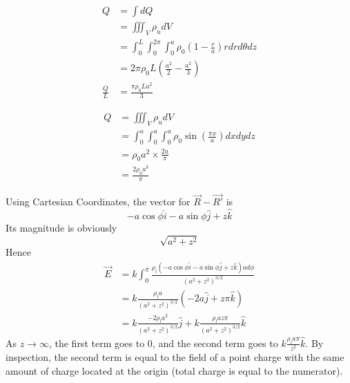 \documentclass[answers]{exam}
\begin{document}
\begin{questions}
\begin{solution}
	\begin{align*}
		Q &= \int dQ \\
		  &= \iiint_V \rho_u dV \\
		  &= \int_0^L\int_0^{2\pi}\int_0^a \rho_0\left(1-\frac{r}{a}\right) rdr d\theta dz \\
		  &= 2\pi\rho_0L\left(\frac{a^2}{2}-\frac{a^2}{3}\right) \\
		\frac{Q}{L} &= \frac{\pi\rho_0La^2}{3}
	\end{align*}
\end{solution}


\begin{solution}
	\begin{align*}
		Q &= \iiint_V \rho_u dV \\
		  &= \int_0^a\int_0^a\int_0^a \rho_0\sin\left(\frac{\pi x}{a}\right)dxdydz \\
		  &= \rho_0a^2\times \frac{2a}{\pi} \\
		  &= \frac{2\rho_0a^3}{\pi}
	\end{align*}
\end{solution}


\begin{solution}
	Using Cartesian Coordinates, the vector for $\vec{R}-\vec{R'}$ is
	$$-a\cos\phi\hat{i} - a\sin\phi\hat{j} + z\hat{k}$$
	Its magnitude is obviously
	$$\sqrt{a^2+z^2}$$
	Hence
	\begin{align*}
		\vec{E} &= k\int_0^\pi \frac{\rho_l(-a\cos\phi\hat{i} - a\sin\phi\hat{j} + z\hat{k})ad\phi}{(a^2+z^2)^{3/2}} \\
			&= k\frac{\rho_la}{(a^2+z^2)^{3/2}}(-2a\hat{j} + z\pi\hat{k}) \\
			&= k\frac{-2\rho_la^2}{(a^2+z^2)^{3/2}}\hat{j} + k\frac{\rho_laz\pi}{(a^2+z^2)^{3/2}}\hat{k}
	\end{align*}
	As $z\rightarrow\infty$, the first term goes to 0, and the second term goes to $k\frac{\rho_la\pi}{z^2}\hat{k}$. By inspection, the second term is equal to the field of a point charge with the same amount of charge located at the origin (total charge is equal to the numerator).
\end{solution}


\end{questions}
\end{document}
